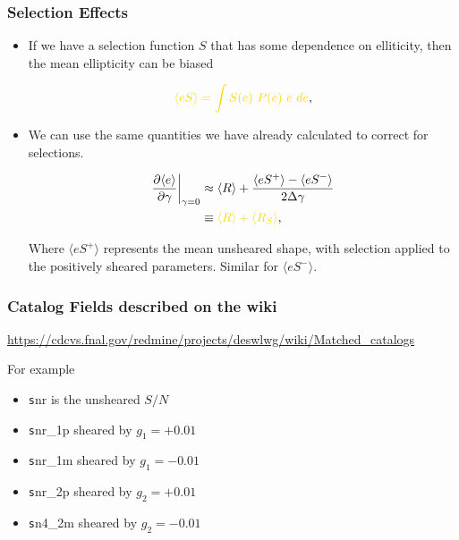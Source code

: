 \documentclass{beamer}
\newcommand{\snr}{$S/N$}
\newcommand{\mest}{e}
\newcommand{\mcalRS}{$R_{S}$}
\begin{document}
\frame
{
    \frametitle{Selection Effects}

 
    \begin{itemize}

        \item If we have a selection function $S$ that has some dependence
            on elliticity, then the mean ellipticity
            can be biased

            \begin{align}
                {\color{gold} \langle \mest S \rangle = \int S(\mest)~P(\mest)~\mest~d\mest},
            \end{align}


        \item We can use the same quantities we have already calculated
            to correct for selections. 

            \begin{align}
                \frac{\partial \langle \mest \rangle}{\partial \gamma}\bigg|_{\gamma=0} &\approx
                \langle R \rangle + \frac{\langle \mest S^+ \rangle - \langle \mest S^- \rangle}{2 \Delta \gamma} \nonumber \\
                &\equiv {\color{gold} \langle R \rangle + \langle \mbox{\mcalRS} \rangle},
            \end{align}

            Where $\langle e S^+ \rangle$ represents the mean unsheared shape, with selection
            applied to the positively sheared parameters.  Similar for $\langle e S^- \rangle$.

    \end{itemize}

}

\frame
{
    \frametitle{Catalog Fields described on the wiki}


    {\small
    \href{https://cdcvs.fnal.gov/redmine/projects/deswlwg/wiki/Matched\_catalogs}{https://cdcvs.fnal.gov/redmine/projects/deswlwg/wiki/Matched\_catalogs}
    }

    For example
    \begin{itemize}
        \item {\color{gold} {\texttt snr}} is the unsheared \snr\
        \item {\color{gold} {\texttt snr\_1p}} sheared by $g_1  = +0.01$
        \item {\color{gold} {\texttt snr\_1m}} sheared by $g_1  = -0.01$
        \item {\color{gold} {\texttt snr\_2p}} sheared by $g_2  = +0.01$
        \item {\color{gold} {\texttt sn4\_2m}} sheared by $g_2  = -0.01$
    \end{itemize}
}
\end{document}
